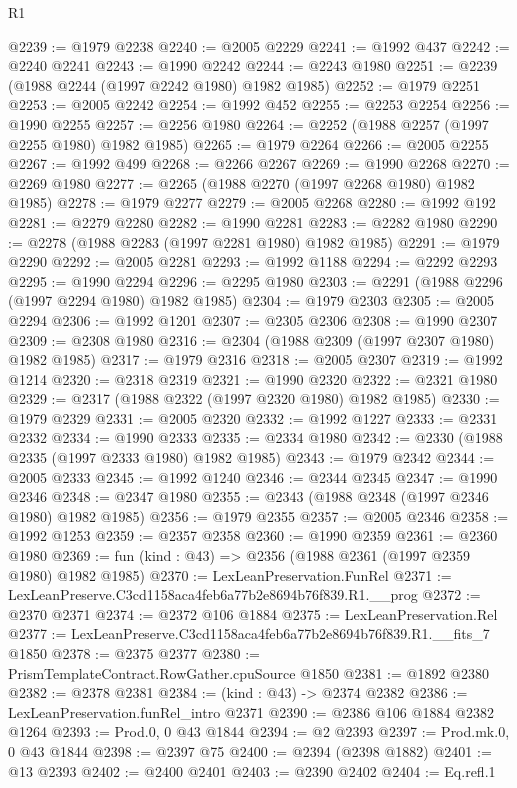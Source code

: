 \begin{lexlean}{R1}
\begin{coremodule}
@2239 := @1979 @2238
@2240 := @2005 @2229
@2241 := @1992 @437
@2242 := @2240 @2241
@2243 := @1990 @2242
@2244 := @2243 @1980
@2251 := @2239 (@1988 @2244 (@1997 @2242 @1980) @1982 @1985)
@2252 := @1979 @2251
@2253 := @2005 @2242
@2254 := @1992 @452
@2255 := @2253 @2254
@2256 := @1990 @2255
@2257 := @2256 @1980
@2264 := @2252 (@1988 @2257 (@1997 @2255 @1980) @1982 @1985)
@2265 := @1979 @2264
@2266 := @2005 @2255
@2267 := @1992 @499
@2268 := @2266 @2267
@2269 := @1990 @2268
@2270 := @2269 @1980
@2277 := @2265 (@1988 @2270 (@1997 @2268 @1980) @1982 @1985)
@2278 := @1979 @2277
@2279 := @2005 @2268
@2280 := @1992 @192
@2281 := @2279 @2280
@2282 := @1990 @2281
@2283 := @2282 @1980
@2290 := @2278 (@1988 @2283 (@1997 @2281 @1980) @1982 @1985)
@2291 := @1979 @2290
@2292 := @2005 @2281
@2293 := @1992 @1188
@2294 := @2292 @2293
@2295 := @1990 @2294
@2296 := @2295 @1980
@2303 := @2291 (@1988 @2296 (@1997 @2294 @1980) @1982 @1985)
@2304 := @1979 @2303
@2305 := @2005 @2294
@2306 := @1992 @1201
@2307 := @2305 @2306
@2308 := @1990 @2307
@2309 := @2308 @1980
@2316 := @2304 (@1988 @2309 (@1997 @2307 @1980) @1982 @1985)
@2317 := @1979 @2316
@2318 := @2005 @2307
@2319 := @1992 @1214
@2320 := @2318 @2319
@2321 := @1990 @2320
@2322 := @2321 @1980
@2329 := @2317 (@1988 @2322 (@1997 @2320 @1980) @1982 @1985)
@2330 := @1979 @2329
@2331 := @2005 @2320
@2332 := @1992 @1227
@2333 := @2331 @2332
@2334 := @1990 @2333
@2335 := @2334 @1980
@2342 := @2330 (@1988 @2335 (@1997 @2333 @1980) @1982 @1985)
@2343 := @1979 @2342
@2344 := @2005 @2333
@2345 := @1992 @1240
@2346 := @2344 @2345
@2347 := @1990 @2346
@2348 := @2347 @1980
@2355 := @2343 (@1988 @2348 (@1997 @2346 @1980) @1982 @1985)
@2356 := @1979 @2355
@2357 := @2005 @2346
@2358 := @1992 @1253
@2359 := @2357 @2358
@2360 := @1990 @2359
@2361 := @2360 @1980
@2369 := fun (kind : @43) => @2356 (@1988 @2361 (@1997 @2359 @1980) @1982 @1985)
@2370 := LexLeanPreservation.FunRel
@2371 := LexLeanPreserve.C3cd1158aca4feb6a77b2e8694b76f839.R1.__prog
@2372 := @2370 @2371
@2374 := @2372 @106 @1884
@2375 := LexLeanPreservation.Rel
@2377 := LexLeanPreserve.C3cd1158aca4feb6a77b2e8694b76f839.R1.__fits_7 @1850
@2378 := @2375 @2377
@2380 := PrismTemplateContract.RowGather.cpuSource @1850
@2381 := @1892 @2380
@2382 := @2378 @2381
@2384 := (kind : @43) -> @2374 @2382
@2386 := LexLeanPreservation.funRel_intro @2371
@2390 := @2386 @106 @1884 @2382 @1264
@2393 := Prod.{0, 0} @43 @1844
@2394 := @2 @2393
@2397 := Prod.mk.{0, 0} @43 @1844
@2398 := @2397 @75
@2400 := @2394 (@2398 @1882)
@2401 := @13 @2393
@2402 := @2400 @2401
@2403 := @2390 @2402
@2404 := Eq.refl.{1}

\end{coremodule}
\end{lexlean}
